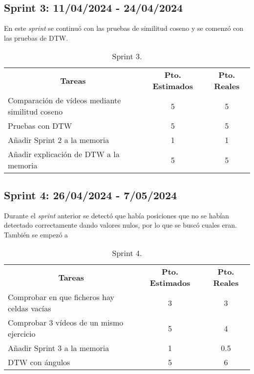 \subsection{Sprint 3: 11/04/2024 - 24/04/2024}
En este \textit{sprint} se continuó con las pruebas de similitud coseno y se comenzó con las pruebas de DTW.
\begin{table}[H]
	\begin{tabular}{lcc}
		\multicolumn{1}{c}{\textbf{Tareas}} & \textbf{Pto. Estimados} & \textbf{Pto. Reales}\\
		Comparación de vídeos mediante similitud coseno & 5 & 5 \\
		Pruebas con DTW & 5 & 5 \\
		Añadir Sprint 2 a la memoria & 1 & 1 \\
		Añadir explicación de DTW a la memoria & 5 & 5 \\
	\end{tabular}
	\caption{Sprint 3.}
	\label{sprint3}
\end{table}

\subsection{Sprint 4: 26/04/2024 - 7/05/2024}
Durante el \textit{sprint} anterior se detectó que había posiciones que no se habían detectado correctamente dando valores nulos, por lo que se buscó cuales eran. También se empezó a  
\begin{table}[H]
	\begin{tabular}{lcc}
		\multicolumn{1}{c}{\textbf{Tareas}} & \textbf{Pto. Estimados} & \textbf{Pto. Reales}\\
		Comprobar en que ficheros hay celdas vacías & 3 & 3 \\
		Comprobar 3 vídeos de un mismo ejercicio & 5 & 4 \\
		Añadir Sprint 3 a la memoria & 1 & 0.5 \\
	    DTW con ángulos& 5 & 6 \\
	\end{tabular}
	\caption{Sprint 4.}
	\label{sprint4}
\end{table}


